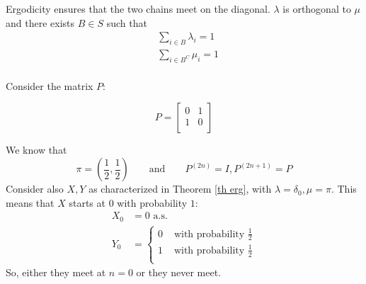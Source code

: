 \documentclass{article}
\begin{document}
\begin{remark}
        Ergodicity ensures that the two chains meet on the diagonal. $\lambda$ is orthogonal to $\mu$ and there exists $B \in S$ such that 
    \begin{align*}
        &\sum_{i \in B} \lambda_i = 1 \\
        &\sum_{i \in B^C} \mu_i = 1 \\
    \end{align*}
\end{remark}
\begin{example}
     Consider the matrix $P$:\\
    \begin{minipage}{0.5\textwidth}
     \center
        \[P=\begin{bmatrix}
        0 & 1 \\
        1 & 0 \\
    \end{bmatrix}\]
    \end{minipage} \hfill
    \begin{minipage}{0.45\textwidth}
    \begin{figure}[H]
            \centering
        \end{figure}
    \end{minipage}
    We know that \[
        \pi = (\frac{1}{2}, \frac{1}{2}) \qquad\text{and}\qquad P^{(2n)} = I, P^{(2n+1)} = P \]
    Consider also $X, Y$ as characterized in Theorem \ref{th erg}, with $\lambda = \delta_0, \mu = \pi$. This means that $X$ starts at $0$ with probability $1$:
    \begin{align*}
        X_0 &= 0 \text{ a.s.} \\
        Y_0 &=
        \begin{cases}
            0 &\text{ with probability } \frac{1}{2} \\
            1 &\text{ with probability } \frac{1}{2} \\
        \end{cases}
    \end{align*}
    So, either they meet at $n = 0$ or they never meet. 
\end{example}
\end{document}
